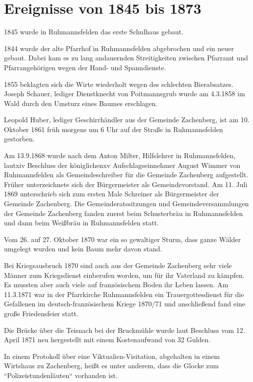 \documentclass{book}
\begin{document}
\section{Ereignisse von 1845 bis 1873}

1845 wurde in Ruhmannsfelden das erste Schulhaus gebaut.

1844 wurde der alte Pfarrhof in Ruhmannsfelden abgebrochen und ein neuer gebaut.
Dabei kam es zu lang andauernden Streitigkeiten zwischen Pfarramt und
Pfarrangehörigen wegen der Hand- und Spanndienste.

1855 beklagten sich die Wirte wiederholt wegen des schlechten Bierabsatzes.
Joseph Schauer, lediger Dienstknecht von Poitmannsgrub wurde am 4.3.1858 im Wald
durch den Umsturz eines Baumes erschlagen.

Leopold Huber, lediger Geschirrhändler aus der Gemeinde Zachenberg, ist am 10.
Oktober 1861 früh morgens um 6 Uhr auf der Straße in Ruhmannsfelden gestorben.

Am 13.9.1868 wurde nach dem Anton Milter, Hilfslehrer in Ruhmannsfelden, lautxiv
Beschluss der königlichenxv Aufschlagseinnehmer August Wimmer von Ruhmannsfelden
als Gemeindeschreiber für die Gemeinde Zachenberg aufgestellt. Früher
unterzeichnete sich der Bürgermeister als Gemeindevorstand. Am 11. Juli 1869
unterschrieb sich zum ersten Male Schreiner als Bürgermeister der Gemeinde
Zachenberg. Die Gemeinderatssitzungen und Gemeindeversammlungen der Gemeinde
Zachenberg fanden zuerst beim Schusterbräu in Ruhmannsfelden und dann beim
Weißbräu in Ruhmannsfelden statt.

Vom 26. auf 27. Oktober 1870 war ein so gewaltiger Sturm, dass ganze Wälder
umgelegt wurden und kein Baum mehr davon stand.

Bei Kriegsausbruch 1870 sind auch aus der Gemeinde Zachenberg sehr viele Männer
zum Kriegsdienst einberufen worden, um für ihr Vaterland zu kämpfen. Es mussten
aber auch viele auf französischem Boden ihr Leben lassen. Am 11.3.1871 war in
der Pfarrkirche Ruhmannsfelden ein Trauergottesdienst für die Gefallenen im
deutsch-französischem Kriege 1870/71 und anschließend fand eine große
Friedensfeier statt.

Die Brücke über die Teisnach bei der Bruckmühle wurde laut Beschluss vom 12.
April 1871 neu hergestellt mit einem Kostenaufwand von 32 Gulden.

In einem Protokoll über eine Viktualien-Visitation, abgehalten in einem
Wirtshaus zu Zachenberg, heißt es unter anderem, dass die Glocke zum
“Polizeistundenläuten“ vorhanden ist.
\end{document}
